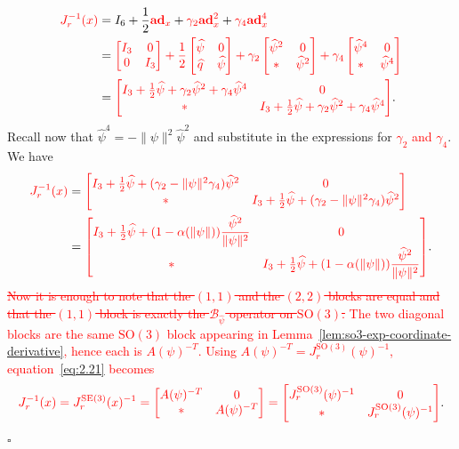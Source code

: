 \documentclass[11pt]{article}
\newcommand{\rev}[1]{\textcolor{red}{#1}}
\newcommand{\del}[1]{\textcolor{red}{\sout{#1}}}
\newcommand{\bad}{\mathbf{ad}}
\newcommand{\JR}{J_r}
\newcommand{\SO}{\mathrm{SO}}
\newcommand{\SE}{\mathrm{SE}}
\newcommand{\proofbox}{\hfill$\square$}
\begin{document}
\begin{align*}
\rev{\JR^{-1}(x)}
&=I_6+\frac12\rev{\bad_x}+\rev{\gamma_2}\rev{\bad_x^2}+\rev{\gamma_4}\rev{\bad_x^4}\\
&=\rev{\begin{bmatrix}I_3&0\\0&I_3\end{bmatrix}
+\frac12\begin{bmatrix}\widehat\psi&0\\\widehat q&\widehat\psi\end{bmatrix}
+\gamma_2\begin{bmatrix}\widehat\psi^2&0\\ *&\widehat\psi^2\end{bmatrix}
+\gamma_4\begin{bmatrix}\widehat\psi^4&0\\ *&\widehat\psi^4\end{bmatrix}}\\
&=\rev{\begin{bmatrix}
I_3+\frac12\widehat\psi+\gamma_2\widehat\psi^2+\gamma_4\widehat\psi^4&0\\
*&I_3+\frac12\widehat\psi+\gamma_2\widehat\psi^2+\gamma_4\widehat\psi^4
\end{bmatrix}}.
\end{align*}
Recall now that $\widehat\psi^4=-\|\psi\|^2\widehat\psi^2$ and substitute in the expressions for \rev{$\gamma_2$ and $\gamma_4$}. We have
\begin{align*}
\rev{\JR^{-1}(x)}
&=\rev{\begin{bmatrix}
I_3+\frac12\widehat\psi+(\gamma_2-\|\psi\|^2\gamma_4)\widehat\psi^2&0\\
*&I_3+\frac12\widehat\psi+(\gamma_2-\|\psi\|^2\gamma_4)\widehat\psi^2
\end{bmatrix}}\\
&=\rev{\begin{bmatrix}
I_3+\frac12\widehat\psi+(1-\alpha(\|\psi\|))\dfrac{\widehat\psi^2}{\|\psi\|^2}&0\\
*&I_3+\frac12\widehat\psi+(1-\alpha(\|\psi\|))\dfrac{\widehat\psi^2}{\|\psi\|^2}
\end{bmatrix}}.
\end{align*}
\del{Now it is enough to note that the $(1,1)$ and the $(2,2)$ blocks are equal and that the $(1,1)$ block is exactly the $\mathcal B_{\widehat\psi}$ operator on $\SO(3)$.} \rev{The two diagonal blocks are the same $\SO(3)$ block appearing in Lemma~\ref{lem:so3-exp-coordinate-derivative}, hence each is $A(\psi)^{-T}$. Using $A(\psi)^{-T}=J_r^{\SO(3)}(\psi)^{-1}$, equation~\eqref{eq:2.21} becomes}
\begin{equation*}
\rev{\JR^{-1}(x)=J_r^{\SE(3)}(x)^{-1}=\begin{bmatrix}A(\psi)^{-T}&0\\ *&A(\psi)^{-T}\end{bmatrix}
=\begin{bmatrix}J_r^{\SO(3)}(\psi)^{-1}&0\\ *&J_r^{\SO(3)}(\psi)^{-1}\end{bmatrix}}.
\end{equation*}
\proofbox
\end{document}

